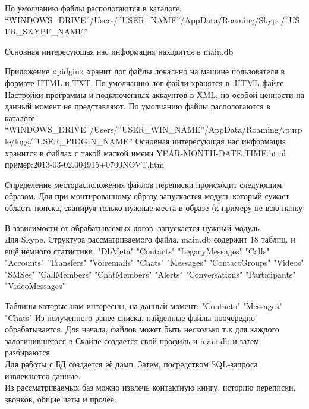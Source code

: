 По умолчанию файлы распологаются в каталоге: “WINDOWS_DRIVE”/Users/”USER_NAME”/AppData/Roaming/Skype/”USER_SKYPE_NAME”

Основная интересующая нас информация находится в main.db

Приложение «pidgin» хранит лог файлы локально на машине пользователя в формате HTML и TXT. По умолчанию лог файли хранятся в .HTML файле. Настройки программы и подключенных аккаунтов в XML, но особой ценности на данный момент не представляют.
По умолчанию файлы распологаются в каталоге: “WINDOWS_DRIVE”/Users/”USER_WIN_NAME”/AppData/Roaming/.purple/logs/”USER_PIDGIN_NAME”
Основная интересующая нас информация хранится в файлах с такой маской имени YEAR-MONTH-DATE.TIME.html пример:2013-03-02.004915+0700NOVT.htm\\


Определение месторасположения файлов переписки происходит следующим образом. Для при монтированному образу запускается модуль который сужает область поиска, сканируя только нужные места в образе (к примеру не всю папку %
\\


В зависимости от обрабатываемых логов, запускается нужный модуль.\\ 
Для Skype.
Структура рассматриваемого файла.
main.db  содержит 18 таблиц. и ещё немного статистики.
"DbMeta"   "Contacts"   "LegacyMessages"
"Calls"     "Accounts"   "Transfers"   
"Voicemails"   "Chats"      "Messages"   
"ContactGroups"   "Videos"   "SMSes"
"CallMembers"   "ChatMembers"   "Alerts"
"Conversations"     "Participants"   "VideoMessages"

Таблицы которые нам интересны, на данный момент:    
 "Contacts"    "Messages"    "Chats" 
Из полученного ранее списка, найденные файлы поочередно обрабатывается. Для начала, файлов может быть несколько т.к для каждого залогинившегося в Скайпе создается свой профиль и main.db и затем разбираются.\\
Для работы с БД создается её дамп. Затем, посредством SQL-запроса извлекаются данные.\\
Из рассматриваемых баз можно извлечь контактную книгу, историю переписки, звонков, общие чаты и прочее.\\

